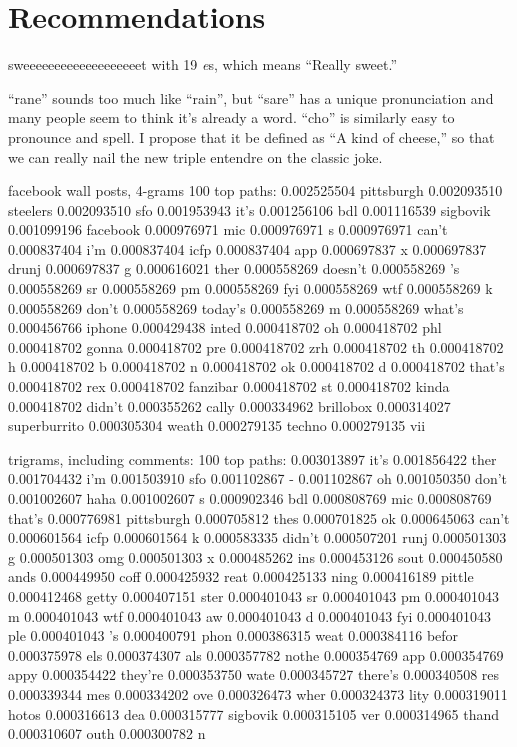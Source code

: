 \documentclass[twocolumn]{article}
\begin{document}
\section{Recommendations}

sweeeeeeeeeeeeeeeeeeet with 19 {\it e}s, which means ``Really sweet.''

``rane'' sounds too much like ``rain'', but ``sare'' has a unique pronunciation and many people seem to think it's already a word. ``cho'' is similarly easy to pronounce and spell. I propose that it be defined as ``A kind of cheese,'' so that we can really nail the new triple entendre on the classic joke.

facebook wall posts, 4-grams
100 top paths:
0.002525504 pittsburgh
0.002093510 steelers
0.002093510 sfo
0.001953943 it's
0.001256106 bdl
0.001116539 sigbovik
0.001099196 facebook
0.000976971 mic
0.000976971 s
0.000976971 can't
0.000837404 i'm
0.000837404 icfp
0.000837404 app
0.000697837 x
0.000697837 drunj
0.000697837 g
0.000616021 ther
0.000558269 doesn't
0.000558269 's
0.000558269 sr
0.000558269 pm
0.000558269 fyi
0.000558269 wtf
0.000558269 k
0.000558269 don't
0.000558269 today's
0.000558269 m
0.000558269 what's
0.000456766 iphone
0.000429438 inted
0.000418702 oh
0.000418702 phl
0.000418702 gonna
0.000418702 pre
0.000418702 zrh
0.000418702 th
0.000418702 h
0.000418702 b
0.000418702 n
0.000418702 ok
0.000418702 d
0.000418702 that's
0.000418702 rex
0.000418702 fanzibar
0.000418702 st
0.000418702 kinda
0.000418702 didn't
0.000355262 cally
0.000334962 brillobox
0.000314027 superburrito
0.000305304 weath
0.000279135 techno
0.000279135 vii


trigrams, including comments:
100 top paths:
0.003013897 it's
0.001856422 ther
0.001704432 i'm
0.001503910 sfo
0.001102867 -
0.001102867 oh
0.001050350 don't
0.001002607 haha
0.001002607 s
0.000902346 bdl
0.000808769 mic
0.000808769 that's
0.000776981 pittsburgh
0.000705812 thes
0.000701825 ok
0.000645063 can't
0.000601564 icfp
0.000601564 k
0.000583335 didn't
0.000507201 runj
0.000501303 g
0.000501303 omg
0.000501303 x
0.000485262 ins
0.000453126 sout
0.000450580 ands
0.000449950 coff
0.000425932 reat
0.000425133 ning
0.000416189 pittle
0.000412468 getty
0.000407151 ster
0.000401043 sr
0.000401043 pm
0.000401043 m
0.000401043 wtf
0.000401043 aw
0.000401043 d
0.000401043 fyi
0.000401043 ple
0.000401043 's
0.000400791 phon
0.000386315 weat
0.000384116 befor
0.000375978 els
0.000374307 als
0.000357782 nothe
0.000354769 app
0.000354769 appy
0.000354422 they're
0.000353750 wate
0.000345727 there's
0.000340508 res
0.000339344 mes
0.000334202 ove
0.000326473 wher
0.000324373 lity
0.000319011 hotos
0.000316613 dea
0.000315777 sigbovik
0.000315105 ver
0.000314965 thand
0.000310607 outh
0.000300782 n
\end{document}
